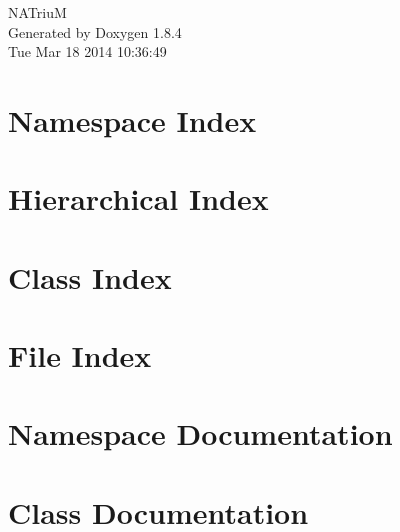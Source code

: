\documentclass[twoside]{book}
\newcommand{\clearemptydoublepage}{%
  \newpage{\pagestyle{empty}\cleardoublepage}%
}
\begin{document}
\hypersetup{pageanchor=false}
\begin{titlepage}
\vspace*{7cm}
\begin{center}%
{\Large N\-A\-Triu\-M }\\
\vspace*{1cm}
{\large Generated by Doxygen 1.8.4}\\
\vspace*{0.5cm}
{\small Tue Mar 18 2014 10:36:49}\\
\end{center}
\end{titlepage}
\clearemptydoublepage
\tableofcontents
\clearemptydoublepage
{}
\hypersetup{pageanchor=true}

\chapter{Namespace Index}

\chapter{Hierarchical Index}

\chapter{Class Index}

\chapter{File Index}

\chapter{Namespace Documentation}

\chapter{Class Documentation}




























\end{document}
